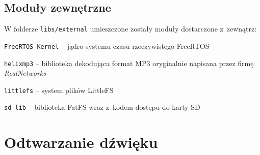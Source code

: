 \documentclass[polish]{aghengthesis}
\let\tempone\itemize
\let\temptwo\enditemize
\renewenvironment{itemize}{\tempone\setlength{\itemsep}{0cm}}{\temptwo}
\begin{document}
		\subsection{Moduły zewnętrzne}
		W folderze \lstinline|libs/external| umieszczone zostały moduły dostarczone z~zewnątrz:
		\begin{itemize}
			\item \lstinline|FreeRTOS-Kernel| -- jądro systemu czasu rzeczywistego FreeRTOS\textsuperscript{\cite{freertos_kernel}}
			\item \lstinline|helixmp3| -- biblioteka dekodująca format MP3\textsuperscript{\cite{helixmp3_repo}} oryginalnie napisana przez firmę \textit{RealNetworks}\textsuperscript{\cite{realnetworks}}
			\item \lstinline|littlefs| -- system plików LittleFS\textsuperscript{\cite{littlefs}}
			\item \lstinline|sd_lib| -- biblioteka FatFS\textsuperscript{\cite{fatfs}} wraz z~kodem dostępu do karty SD\textsuperscript{\cite{sdfs}}
		\end{itemize}

	\section{Odtwarzanie dźwięku}
%		
%		
%		
		
\end{document}
